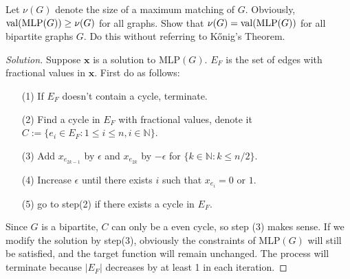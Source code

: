 



    \maketitle

    \begin{thm}{}{}
        Let $\nu(G)$ denote the size of a maximum matching of $G$.
        Obviously, ${\rm val}({\rm MLP}(G))\ge \nu(G)$ for all graphs.
        Show that $\nu(G)={\rm val}({\rm MLP}(G))$ for all bipartite graphs $G$.
        Do this without referring to K\H{o}nig's Theorem.
    \end{thm}
    \begin{proof}[Solution]
        Suppose $\mathbf{x}$ is a solution to MLP$(G)$.
        $E_F$ is the set of edges with fractional values in $\mathbf{x}$.
        First do as follows:
        \begin{itemize}
            \item[(1)] If $E_F$ doesn't contain a cycle, terminate.
            \item[(2)] Find a cycle in $E_F$ with fractional values, denote it $C:=\{e_i\in E_F :1\le i \le n,i\in\mathbb{N}\}$.
            \item[(3)] Add $x_{e_{2k-1}}$ by $\epsilon$ and $x_{e_{2k}}$ by $-\epsilon$ for $\{k\in \mathbb{N}:k \le n/2\}$.
            \item[(4)] Increase $\epsilon$ until there exists $i$ such that $x_{e_i}=0 \text{ or } 1$.
            \item[(5)] go to step(2) if there exists a cycle in $E_F$.
        \end{itemize}
        Since $G$ is a bipartite, $C$ can only be a even cycle, so step (3) makes sense.
        If we modify the solution by step(3), obviously the constraints of MLP$(G)$ will still be satisfied, and the target function will remain unchanged.
        The process will terminate because $|E_F|$ decreases by at least 1 in each iteration.


\end{proof}
